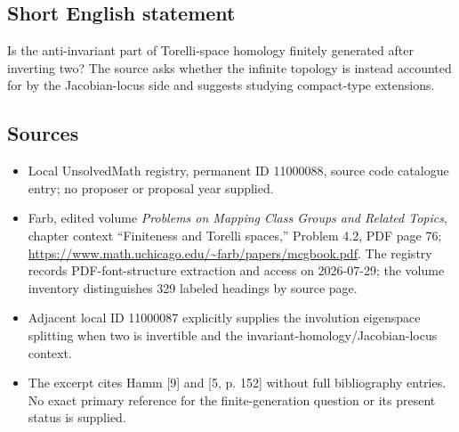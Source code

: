 \documentclass[11pt]{article}
\begin{document}
\subsection{Short English statement}
Is the anti-invariant part of Torelli-space homology finitely generated after inverting two? The source asks whether the infinite topology is instead accounted for by the Jacobian-locus side and suggests studying compact-type extensions.
\subsection{Sources}
\begin{itemize}
\item Local UnsolvedMath registry, permanent ID 11000088, source code catalogue entry; no proposer or proposal year supplied.
\item Farb, edited volume \emph{Problems on Mapping Class Groups and Related Topics}, chapter context ``Finiteness and Torelli spaces,'' Problem 4.2, PDF page 76; \url{https://www.math.uchicago.edu/~farb/papers/mcgbook.pdf}. The registry records PDF-font-structure extraction and access on 2026-07-29; the volume inventory distinguishes 329 labeled headings by source page.
\item Adjacent local ID 11000087 explicitly supplies the involution eigenspace splitting when two is invertible and the invariant-homology/Jacobian-locus context.
\item The excerpt cites Hamm [9] and [5, p. 152] without full bibliography entries. No exact primary reference for the finite-generation question or its present status is supplied.
\end{itemize}
\end{document}
